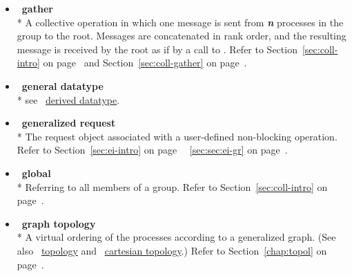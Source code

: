 \begin{itemize}
\label{glossary:gather}
\item  ~\hypertarget{glossary:gather}{\textbf{gather}} \\*
A collective operation in which one message is sent from \emph{\textbf{n}} 
processes in the group to the root. Messages are concatenated in rank order, and the
resulting message is received by the root as if by a call to
.
Refer to Section~\ref{sec:coll-intro} on page~\pageref{sec:coll-intro} and  
Section~\ref{sec:coll-gather} on page~\pageref{sec:coll-gather}.

\label{glossary:general_datatype}
\item  ~\hypertarget{glossary:general_datatype}{\textbf{general datatype}} \\*
see ~\hyperlink{glossary:derived_datatype}{derived datatype}.

\label{glossary:generalized_request}
\item  ~\hypertarget{glossary:generalized_request}{\textbf{generalized request}} \\*
The request object associated with a user-defined non-blocking operation.
Refer to Section~\ref{sec:ei-intro} on page~\pageref{sec:ei-intro} 
~\ref{sec:sec:ei-gr} on page~\pageref{sec:ei-gr}.

\label{glossary:global}
\item  ~\hypertarget{glossary:global}{\textbf{global}} \\*
Referring to all members of a group.
Refer to Section~\ref{sec:coll-intro} on page~\pageref{sec:coll-intro}.

\label{glossary:graph_topology}
\item  ~\hypertarget{glossary:graph_topology}{\textbf{graph topology}} \\*
A virtual ordering of the processes according to a generalized graph.
(See also ~\hyperlink{glossary:topology}{topology} and ~\hyperlink{glossary:cartesian_topology}{cartesian topology}.)
Refer to Section~\ref{chap:topol} on page~\pageref{chap:topol}.


\end{itemize}

